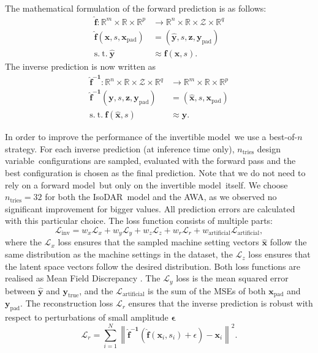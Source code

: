 \documentclass[a4paper, 12pt, version-1-compatibility]{article}
\def\forwardmodel{forward model}
\def\invertiblemodel{invertible model}
\def\isodar{IsoDAR}
\def\dvar{design variable}
\newcommand{\myvec}[1]{\mathbf{#1}}
\begin{document}
The mathematical formulation of the forward prediction is as follows:
\begin{align*}
    \myvec{\hat{f}}: \mathbb{R}^m \times \mathbb{R} \times \mathbb{R}^p &\rightarrow \mathbb{R}^n \times \mathbb{R} \times \mathcal{Z} \times \mathbb{R}^q\\
    \myvec{\hat{f}}(\myvec{x}, s, \myvec{x}_\mathrm{pad}) &= (\myvec{\hat{y}}, s, \myvec{z}, \myvec{y}_\mathrm{pad})\\
    \mathrm{s.\ t.\ } \myvec{\hat{y}} &\approx \myvec{f}(\myvec{x}, s).
\end{align*}
The inverse prediction is now written as
\begin{align*}
    \myvec{\hat{f}^{-1}}: \mathbb{R}^n \times \mathbb{R} \times \mathcal{Z} \times \mathbb{R}^q &\rightarrow \mathbb{R}^m \times \mathbb{R} \times \mathbb{R}^p\\
    \myvec{\hat{f}^{-1}}(\myvec{y}, s, \myvec{z}, \myvec{y}_\mathrm{pad}) &= (\myvec{\hat{x}}, s, \myvec{x}_\mathrm{pad})\\
    \mathrm{s.\ t.\ } \myvec{f}(\myvec{\hat{x}}, s) &\approx \myvec{y}.
\end{align*}

In order to improve the performance of the \invertiblemodel\, we use a best-of-$n$ strategy. For each inverse prediction (at inference time only), $n_\mathrm{tries}$ \dvar\ configurations are sampled, evaluated with the forward pass and the best configuration is chosen as the final prediction. Note that we do not need to rely on a \forwardmodel\, but only on the \invertiblemodel\ itself. We choose $n_\mathrm{tries} = 32$ for both the \isodar\ model and the AWA, as we observed no significant improvement for bigger values. All prediction errors are calculated with this particular choice.
The loss function consists of multiple parts: 
\begin{equation}
    \mathcal{L}_\mathrm{inv} = w_x \mathcal{L}_x + w_y \mathcal{L}_y + w_z \mathcal{L}_z + w_r \mathcal{L}_r + w_\mathrm{artificial} \mathcal{L}_\mathrm{artificial},
    \label{equ:inv_loss}
\end{equation}
 where the $\mathcal{L}_x$ loss ensures that the sampled machine setting vectors $\myvec{\hat{x}}$ follow the same distribution as the machine settings in the dataset, the $\mathcal{L}_z$ loss ensures that the latent space vectors follow the desired distribution. Both loss functions are realised as Mean Field Discrepancy \cite{gretton2012kernel}. The $\mathcal{L}_y$ loss is the mean squared error between $\hat{\myvec{y}}$ and $\myvec{y}_\mathrm{true}$, and the $\mathcal{L}_\mathrm{artificial}$ is the sum of the MSEs of both $\myvec{x}_\mathrm{pad}$ and $\myvec{y}_\mathrm{pad}$. The reconstruction loss $\mathcal{L}_r$ ensures that the inverse prediction is robust with respect to perturbations of small amplitude $\myvec{\epsilon}$
\begin{equation*}
    \mathcal{L}_r = \sum_{i = 1}^N \left\lVert \myvec{\hat{f}^{-1}} \left( \myvec{\hat{f}}(\myvec{x}_i, s_i) + \epsilon \right) - \myvec{x}_i \right\rVert^2.
\end{equation*}
\end{document}
